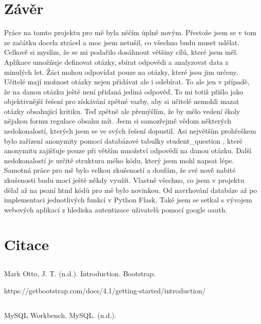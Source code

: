 \documentclass[11pt,a4paper,twoside,openright]{report}
\begin{document}
{\chapter*{Závěr}
\pagestyle{empty}

Práce na tomto projektu pro mě byla něčím úplně novým. Přestože jsem se v tom ze začátku docela ztrácel a moc jsem netušil, co všechno budu muset udělat. Celkově si myslím, že se mi podařilo dosáhnout většiny cílů, které jsem měl. Aplikace umožňuje definovat otázky, sbírat odpovědi a analyzovat data z minulých let. Žáci mohou odpovídat pouze na otázky, které jsou jim určeny. Učitelé mají možnost otázky nejen přidávat ale i odebírat. To ale jen v případě, že na danou otázku ještě není přidaná jediná odpověď. To mi totiž přišlo jako objektivnější řešení pro získávání zpětné vazby, aby si učitelé nemohli mazat otázky obsahující kritiku. Teď zpětně ale přemýšlím, že by mělo vedení školy nějakou formu regulace obsahu mít. Jsem si samozřejmě vědom některých nedokonalostí, kterých jsem se ve svých řešení dopustil.
Asi největším prohřeškem bylo zařízení  anonymity pomocí databázové tabulky student\_question , které anonymitu zajišťuje pouze při větším množství odpovědí na danou otázku. Další nedokonalostí je určitě struktura mého kódu, který jsem mohl napsat lépe. Samotná práce pro mě bylo velkou zkušeností a doufám, že své nově nabité zkušenosti budu moci ještě někdy využít. Vlastně všechno, co jsem v projektu dělal až na psaní html kódů pro mě bylo novinkou. Od navrhování databáze až po implementaci jednotlivých funkcí v Python Flask. Také jsem se setkal s vývojem webových aplikací z hlediska autentizace uživatelů pomocí google oauth.

\chapter{Citace}

\section{}
Mark Otto, J. T. (n.d.). Introduction. Bootstrap.
 
https://getbootstrap.com/docs/4.1/getting-started/introduction/ 

\section{}
MySQL Workbench. MySQL. (n.d.). 

}
\end{document}
